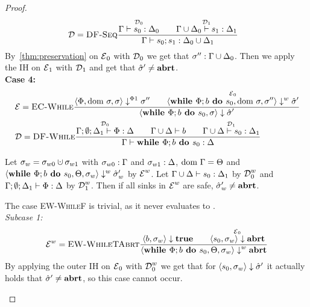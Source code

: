 \begin{proof}
\begin{align*}
        &\operatorname{\mathcal{D}} = \textsc{DF-Seq}\frac{\displaystyle \overset{\operatorname{\mathcal{D}}_0}{\Gamma \vdash {s_0}: \Delta_0}\qquad
        \overset{\operatorname{\mathcal{D}}_1}{\Gamma \cup \Delta_0 \vdash {s_1}: \Delta_1}}{\displaystyle \Gamma \vdash {{s_0}; {s_1}}: \Delta_0 \cup \Delta_1}
    \end{align*}
    By~\autoref{thm:preservation} on $\operatorname{\mathcal{E}}_0$ with $\operatorname{\mathcal{D}}_0$ we get that ${\sigma''}:{\Gamma \cup \Delta_0}$.
    Then we apply the IH on $\operatorname{\mathcal{E}}_1$ with $\operatorname{\mathcal{D}}_1$ and get that $\hat{\sigma}{}' \neq \textbf{abrt}$.\\
    \textbf{Case 4:}
    \begin{align*}
        &\operatorname{\mathcal{E}} = \textsc{EC-While}\frac{\displaystyle \langle \Phi, \text{dom }{\sigma}, \sigma \rangle \downarrow^{\Phi1} \sigma'' \qquad
        \overset{\operatorname{\mathcal{E}}_0}{\langle \textbf{while }\Phi;{b} \textbf{ do } {s_0}, \text{dom }{\sigma}, \sigma'' \rangle \downarrow^w \hat{\sigma}'}}{\displaystyle \langle \textbf{while }\Phi;{b} \textbf{ do } {s_0}, \sigma \rangle \downarrow \hat{\sigma}'}\\
        &\operatorname{\mathcal{D}} = \textsc{DF-While}\frac{\displaystyle \overset{\operatorname{\mathcal{D}}_0}{\Gamma;\emptyset;\Delta_1 \vdash {\Phi}: \Delta}\qquad
        \Gamma \cup \Delta \vdash {b}\qquad
        \overset{\operatorname{\mathcal{D}}_1}{\Gamma \cup \Delta \vdash {s_0}: \Delta_1}}{\displaystyle \Gamma \vdash {\textbf{while }\Phi;{b} \textbf{ do } {s_0}}: \Delta}
    \end{align*}
    \begin{claim}
        Let $\store_w = \store_{w0} \dunion \store_{w1}$ with
        ${\sigma_{w0}}:{\Gamma}$ and ${\sigma_{w1}}:{\Delta}$,
         $\text{dom }{\Gamma} = \Theta$ and
        $\langle \textbf{while }\Phi;{b} \textbf{ do } {s_0}, \Theta, \sigma_w \rangle \downarrow^w \hat{\sigma}{}'_w$ by $\operatorname{\mathcal{E}}^w$.
        Let $\Gamma \cup \Delta \vdash {s_0}: \Delta_1$ by $\operatorname{\mathcal{D}}^w_0$
        and $\Gamma;\emptyset;\Delta_1 \vdash {\Phi}: \Delta$ by $\operatorname{\mathcal{D}}^w_1$.
        Then if all sinks in $\operatorname{\mathcal{E}}^w$ are safe, $\hat{\sigma}{}'_w \neq \textbf{abrt}$.
    \end{claim}
    \begin{claimproof}
        The case \textsc{EW-WhileF} is trivial, as it never evaluates to \exception.\\
        \emph{Subcase 1:}
        \begin{align*}
            \operatorname{\mathcal{E}}^w = \textsc{EW-WhileTAbrt}\frac{\displaystyle \langle b, \sigma_w \rangle \downarrow \textbf{true} \qquad 
            \overset{\operatorname{\mathcal{E}}_0}{\langle s_0, \sigma_w \rangle \downarrow \textbf{abrt}}}{\displaystyle \langle \textbf{while }\Phi;{b} \textbf{ do } {s_0}, \Theta, \sigma_w \rangle \downarrow^w \textbf{abrt}}
        \end{align*}
        By applying the outer IH on $\operatorname{\mathcal{E}}_0$ with $\operatorname{\mathcal{D}}^w_0$ we get that for 
        $\langle s_0, \sigma_w \rangle \downarrow \hat{\sigma}{}'$ it actually holds that $\hat{\sigma}{}' \neq \textbf{abrt}$,
        so this case cannot occur.\\

\end{claimproof}
\end{proof}
